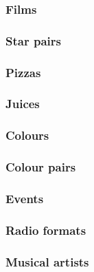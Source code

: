 \documentclass[11pt,letter]{article}
\begin{document}
\subsubsection{Films}



\subsubsection{Star pairs}



\subsubsection{Pizzas}



\subsubsection{Juices}



\subsubsection{Colours}



\subsubsection{Colour pairs}



\subsubsection{Events}



\subsubsection{Radio formats}



\subsubsection{Musical artists}


\end{document}
